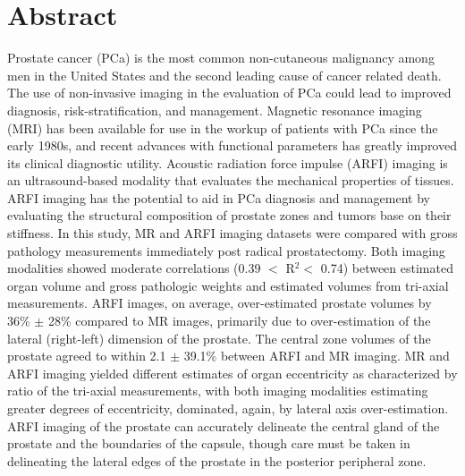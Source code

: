 \section*{Abstract}
Prostate cancer (PCa) is the most common non-cutaneous malignancy among men in
the United States and the second leading cause of cancer related death.  The
use of non-invasive imaging in the evaluation of PCa could lead to improved
diagnosis, risk-stratification, and management.  Magnetic resonance imaging
(MRI) has been available for use in the workup of patients with PCa since the
early 1980s, and recent advances with functional parameters has greatly
improved its clinical diagnostic utility.  Acoustic radiation force impulse
(ARFI) imaging is an ultrasound-based modality that evaluates the mechanical
properties of tissues. ARFI imaging has the potential to aid in PCa diagnosis
and management by evaluating the structural composition of prostate zones and
tumors base on their stiffness.  In this study, MR and ARFI imaging datasets
were compared with gross pathology measurements immediately post radical
prostatectomy.  Both imaging modalities showed moderate correlations (0.39 $<$
R$^2 < $ 0.74) between estimated organ volume and gross pathologic weights and
estimated volumes from tri-axial measurements.  ARFI images, on average,
over-estimated prostate volumes by 36\% $\pm$ 28\% compared to MR images,
primarily due to over-estimation of the lateral (right-left) dimension of the
prostate.  The central zone volumes of the prostate agreed to within 2.1 $\pm$
39.1\% between ARFI and MR imaging.  MR and ARFI imaging yielded different
estimates of organ eccentricity as characterized by ratio of the tri-axial
measurements, with both imaging modalities estimating greater degrees of
eccentricity, dominated, again, by lateral axis over-estimation.  ARFI imaging
of the prostate can accurately delineate the central gland of the prostate and
the boundaries of the capsule, though care must be taken in delineating the
lateral edges of the prostate in the posterior peripheral zone.
